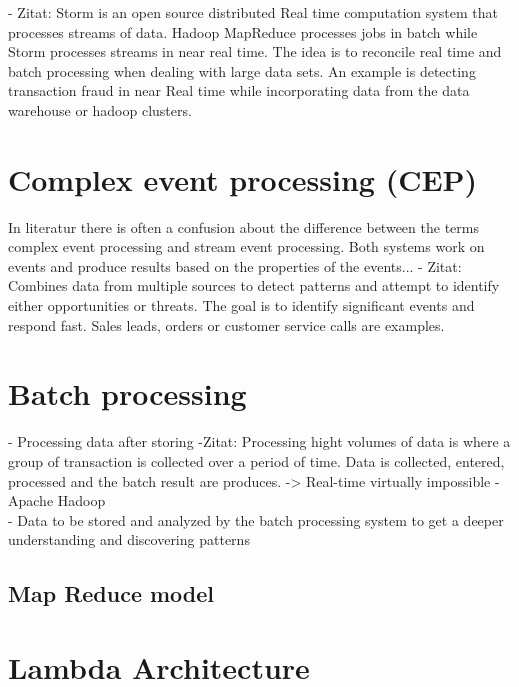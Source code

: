 - Zitat: Storm is an open source distributed Real time computation system that
processes streams of data. Hadoop MapReduce processes jobs in batch while
Storm processes streams in near real time. The idea is to reconcile real time
and batch processing when dealing with large data sets. An example is detecting
transaction fraud in near Real time while incorporating data from the data
warehouse or hadoop clusters.\\

\section{Complex event processing (CEP)}
In literatur there is often a confusion about the difference between the terms
complex event processing and stream event processing. Both systems work on
events and produce results based on the properties of the events... 
- Zitat: Combines data from multiple sources  to detect patterns and attempt to
identify either opportunities or threats. The goal is to identify significant
events and respond fast. Sales leads, orders or customer service calls are
examples.\\


\section{Batch processing}
- Processing data after storing 
-Zitat: Processing hight volumes of data is where a group of transaction is collected
over a period of time. Data is collected, entered, processed and the batch
result are produces. -> Real-time virtually impossible
- Apache Hadoop\\
- Data to be stored and analyzed by the batch processing system to get a deeper
understanding and discovering patterns
\subsection{Map Reduce model }

\section{Lambda Architecture}
\cite{PrpSvyOfDSPS}

